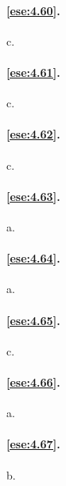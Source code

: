\paragraph{\ref{ese:4.60}.}
c.

\paragraph{\ref{ese:4.61}.}
c.

\paragraph{\ref{ese:4.62}.}
c.

\paragraph{\ref{ese:4.63}.}
a.

\paragraph{\ref{ese:4.64}.}
a.

\paragraph{\ref{ese:4.65}.}
c.

\paragraph{\ref{ese:4.66}.}
a.

\paragraph{\ref{ese:4.67}.}
b.

\endgroup

